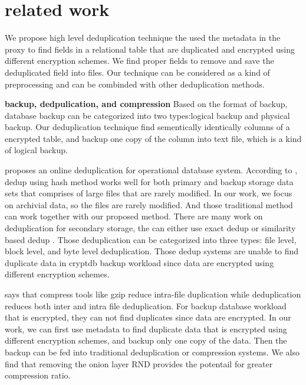 \section{related work}

We propose high level deduplication technique the used the metadata in the proxy to find fields in a relational table that are duplicated and encrypted using different encryption schemes. We find proper fields to remove and save the deduplicated field into files. Our technique can be considered as a kind of preprocessing and can be combinded with other deduplication methods.


\textbf{backup, dedpulication, and compression} Based on the format of backup, database backup can be categorized into two types:logical backup and physical backup\citep{mysqlbackup}. Our deduplication technique find sementically identically columns of a encrypted table, and backup one copy of the column into text file, which is a kind of logical backup. 



\citep{xu2017online} proposes an online deduplication for operational database system. According to \citep{xu2017online}, dedup using hash method works well for both primary and backup storage data sets that comprises of large files that are rarely modified. In our work, we focus on archivial data, so the files are rarely modified. And those traditional method can work together with our proposed method. There are many work on deduplication for secondary storage, the can either use exact dedup\citep{dubnicki2009hydrastor} or similarity based dedup\citep{xu2015reducing} \citep{aronovich2009design}\citep{you2005deep}. Those deduplication can be categorized into three types: file level, block level, and byte level deduplication. Those dedup systems are unable to find duplicate data in cryptdb backup workload since data are encrypted using different encryption schemes.



\citep{mandagere2008demystifying} says that compress tools like gzip reduce intra-file duplication while deduplication reduces both inter and intra file deduplication. For backup database workload that is encrypted, they can not find duplicates since data are encrypted. In our work, we can first use metadata to find duplicate data that is encrypted using different encryption schemes, and backup only one copy of the data. Then the backup can be fed into traditional deduplication or compression systems. We also find that removing the onion layer RND provides the potentail for greater compression ratio. 


